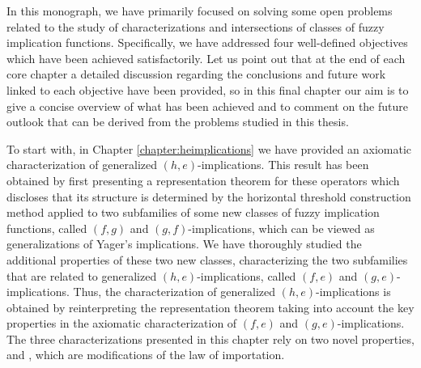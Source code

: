 
In this monograph, we have primarily focused on solving some open problems related to the study of characterizations and intersections of classes of fuzzy implication functions. Specifically, we have addressed four well-defined objectives which have been achieved satisfactorily. Let us point out that at the end of each core chapter a detailed discussion regarding the conclusions and future work linked to each objective have been provided, so in this final chapter our aim is to give a concise overview of what has been achieved and to comment on the future outlook that can be derived from the problems studied in this thesis.

To start with, in Chapter \ref{chapter:heimplications} we have provided an axiomatic characterization of generalized $(h,e)$-implications. This result has been obtained by first presenting a representation theorem for these operators which discloses that its structure is determined by the horizontal threshold construction method applied to two subfamilies of some new classes of fuzzy implication functions, called $(f,g)$ and $(g,f)$-implications, which can be viewed as generalizations of Yager's implications. We have thoroughly studied the additional properties of these two new classes, characterizing the two subfamilies that are related to generalized $(h,e)$-implications, called $(f,e)$ and $(g,e)$-implications. Thus, the characterization of generalized $(h,e)$-implications is obtained by reinterpreting the representation theorem taking into account the key properties in the axiomatic characterization of $(f,e)$ and $(g,e)$-implications. The three characterizations presented in this chapter rely on two novel properties, \LIex and \LIey, which are modifications of the law of importation.

